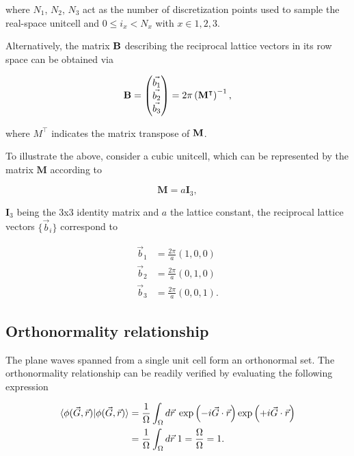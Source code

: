 where $N_{1}$, $N_{2}$, $N_{3}$ act as the number of discretization points used to sample the real-space unitcell and $0 \leq i_{x} < N_{x}$ with $x \in 1,2,3$.

Alternatively, the matrix $\mathbf{B}$ describing the reciprocal lattice vectors in its row space can be obtained via

\begin{equation}
    \mathbf{B} = \left(
    \begin{matrix}
        \vec{b_{1}}\\
        \vec{b_{2}}\\
        \vec{b_{3}}
    \end{matrix}
    \right) = 2 \pi \left( \mathbf{M}^{\intercal} \right)^{-1},
\end{equation}

where $M^{\intercal}$ indicates the matrix transpose of $\mathbf{M}$.

To illustrate the above, consider a cubic unitcell, which can be represented by the matrix $\mathbf{M}$ according to

\begin{equation}
    \mathbf{M} = a \mathbf{I}_{3},
\end{equation}

$\mathbf{I}_{3}$ being the 3x3 identity matrix and $a$ the lattice constant, the reciprocal lattice vectors $\{\vec{b}_{i}\}$ correspond to

\begin{align}
    \vec{b}_{1} &= \frac{2\pi}{a} \left(1,0,0\right) \\
    \vec{b}_{2} &= \frac{2\pi}{a} \left(0,1,0\right) \\
    \vec{b}_{3} &= \frac{2\pi}{a} \left(0,0,1\right).
\end{align}

%
%
%
\subsection{Orthonormality relationship}

The plane waves spanned from a single unit cell form an orthonormal set. The orthonormality relationship can be readily verified by evaluating the following expression

\begin{align}
    \braket{\phi(\vec{G},\vec{r}) | \phi(\vec{G},\vec{r})} &= \frac{1}{\Omega} \int_{\Omega} d \vec{r} \;\exp \left(-i \vec{G} \cdot \vec{r} \right) \exp \left(+i \vec{G} \cdot \vec{r} \right) \\
    &= \frac{1}{\Omega} \int_{\Omega} d \vec{r} \; 1 = \frac{\Omega}{\Omega} = 1. \\
\end{align}

